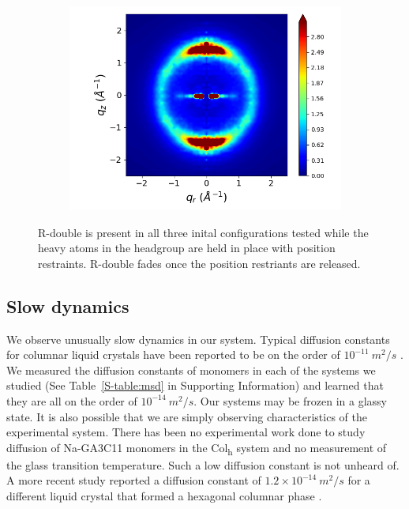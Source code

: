 \documentclass[journal=jpcbfk,manusciprt=article]{achemso}
\begin{document}
\begin{figure}[htb]
\begin{subfigure}{0.3\linewidth}
  	\includegraphics[width=\textwidth]{rotated_monomers_rzplot_norestraints.png}
  	\caption{}\label{fig:rotated_monomers_rzplot_norestraints}
  \end{subfigure}
  \caption{R-double is present in all three inital configurations tested while the heavy atoms
  in the headgroup are held in place with position restraints. R-double fades once 
  the position restriants are released.}\label{fig:rdouble}
  \end{figure}
  
  
  \subsection{Slow dynamics}

  We observe unusually slow dynamics in our system. Typical diffusion constants
  for columnar liquid crystals have been reported to be on the order of
  $10^{-11}~ m^2/s$ \cite{dong_translational_1984}. We measured the diffusion
  constants of monomers in each of the systems we studied (See Table~\ref{S-table:msd}
  in Supporting Information) and learned that they are all on the order of $10^{-14}~m^2/s$.
  Our systems may be frozen in a glassy state. It is also possible that we are simply 
  observing characteristics of the experimental system. There has been no experimental work
  done to study diffusion of Na-GA3C11 monomers in the Col\textsubscript{h}
  system and no measurement of the glass transition temperature. Such a low
  diffusion constant is not unheard of. A more recent study reported a diffusion
  constant of $1.2\times10^{-14}~m^2/s$ for a different liquid crystal that
  formed a hexagonal columnar phase \cite{dvinskikh_molecular_2002}. 
\end{document}
